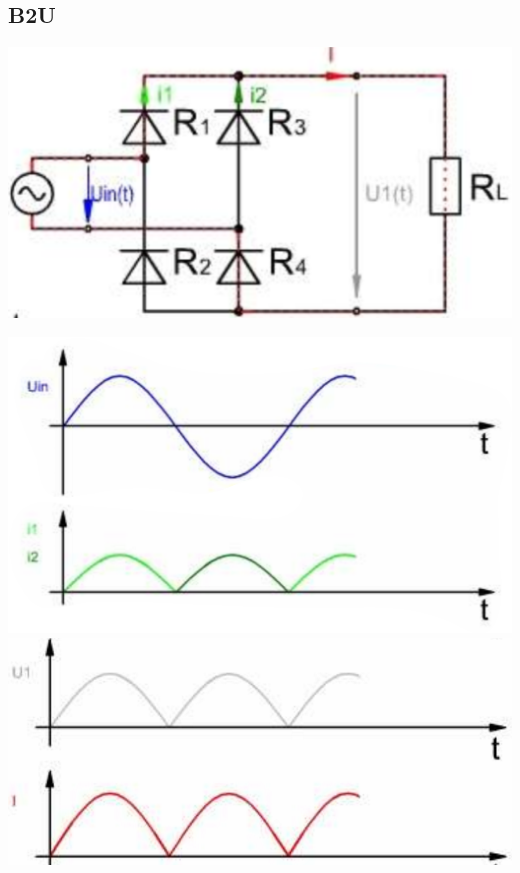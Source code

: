 \subsection{B2U}
\begin{minipage}{0.4\textwidth}
    \includegraphics[width=\linewidth]{images/PrakUGB2}
\end{minipage}
\begin{minipage}{0.25\linewidth}
    \centering
    \includegraphics[width=0.9\linewidth]{images/PrakUGB2Kl1}
    \includegraphics[width=0.9\linewidth]{images/PrakUGB2Kl2}
\end{minipage}
